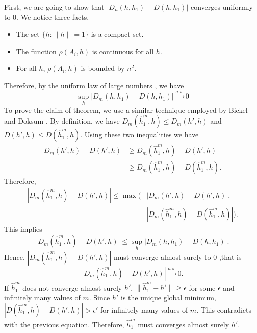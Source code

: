\documentclass[10pt,journal,compsoc]{IEEEtran}
\newenvironment{proof}[1][Proof]{\begin{trivlist}
		\item[\hskip \labelsep {\bfseries #1}]}{\end{trivlist}}
\begin{document}
\appendix
\begin{proof} [Proof of Theorem 4.1]
First,  we are going to show that $|D_n(h,h_1)-D(h,h_1)|$ converges uniformly to $0$.
We notice three facts,
\begin{itemize}
	\item[(1)] The set $\{h: \|h\|=1\}$ is a compact set.
	\item[(2)] The function $\rho(A_i,h)$ is continuous for all $h$.
	\item[(3)] For all $h$, $\rho(A_i,h)$ is bounded by $n^2$.
\end{itemize}
Therefore, by the uniform law of large numbers \cite{jennrich1969asymptotic}, we have
\[\underset{h}{\sup}|D_m(h,h_1)-D(h,h_1)|\overset{a.s.}{\rightarrow} 0\]
To prove the claim of theorem, we use a similar technique employed by Bickel and Doksum \cite{bickel2015mathematical}. By definition, we have $D_m(\hat{h}_1^m,h)  \leq D_m(h',h)$ and $D(h',h) \leq D(\hat{h}_1^m,h)$. Using these two inequalities we have
\begin{align*}
D_m(h',h)-D(h',h) &\geq D_m(\hat{h}_1^m,h)-D(h',h) \\
&\geq D_m(\hat{h}_1^m,h)-D(\hat{h}_1^m,h) .
\end{align*}
Therefore, 
\begin{align*}
|D_m(\hat{h}_1^m,h)-D(h',h)|  \leq  \max(&|D_m(h',h)-D(h',h)|,\\
& |D_m(\hat{h}_1^m,h)-D(\hat{h}_1^m,h)|).
\end{align*}
This implies 
\[ |D_m(\hat{h}_1^m,h)-D(h',h)| \leq \underset{h}{\sup}|D_m(h,h_1)-D(h,h_1)|. \]
Hence, $|D_m(\hat{h}_1^m,h)-D(h',h)|$ must converge almost surely to $0$ ,that is
\[|D_m(\hat{h}_1^m,h)-D(h',h)|\overset{a.s.}{\rightarrow} 0 .\]
 If $\hat{h}_1^m$ does not converge almost surely $h'$, $\|\hat{h}_1^m-h'\|\geq \epsilon$ for some $\epsilon$ and infinitely many values of $m$. Since $h'$ is the unique global minimum, $|D(\hat{h}_1^m,h)-D(h',h)| > \epsilon' $ for infinitely many values of $m$. This contradicts with the previous equation. Therefore, $\hat{h}_1^m$ must converges almost surely $h'$.
	
\end{proof}
\end{document}
